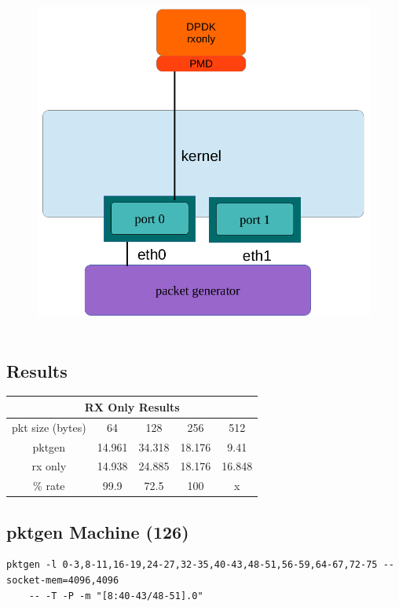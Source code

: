 \documentclass[letter]{article}
\begin{document}
{{\begin{figure}[H]
\hbox{\includegraphics[scale=0.6]{rx-only} }
\end{figure}

\subsection{Results}
\large
\begin{center}
\begin{tabular}{ |c|c|c|c|c| }
\hline
\multicolumn{5}{|c|}{RX Only Results} \\
 \hline
 pkt size (bytes) & 64 & 128 & 256 & 512 \\ 
\hline
 pktgen & 14.961 & 34.318 & 18.176 & 9.41  \\ 
 rx only & 14.938 & 24.885 & 18.176 & 16.848 \\ 
\hline
\rowcolor{yellow}
\% rate & 99.9 & 72.5 & 100 & x \\
 \hline
\end{tabular}
\end{center}

\subsection{pktgen Machine (126)}

\begin{lstlisting}
pktgen -l 0-3,8-11,16-19,24-27,32-35,40-43,48-51,56-59,64-67,72-75 --socket-mem=4096,4096 
	-- -T -P -m "[8:40-43/48-51].0"
\end{lstlisting}

}}
\end{document}
